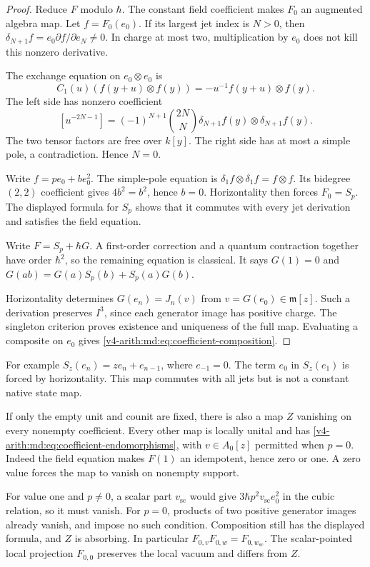 \begin{proof}
Reduce $F$ modulo $\hbar$. The constant field
coefficient makes $F_0$ an augmented algebra map.
Let $f=F_0(e_0)$. If its largest jet index is
$N>0$, then
$\delta_{N+1}f=e_0\partial f/\partial e_N\ne0$.
In charge at most two, multiplication by $e_0$
does not kill this nonzero derivative.

The exchange equation on $e_0\otimes e_0$ is
\[
 C_1(u)(f(y+u)\otimes f(y))
 =-u^{-1}f(y+u)\otimes f(y).
\]
The left side has nonzero coefficient
\[
 [u^{-2N-1}]=(-1)^{N+1}\binom{2N}{N}
       \delta_{N+1}f(y)\otimes\delta_{N+1}f(y).
\]
The two tensor factors are free over $k[y]$.
The right side has at most a simple pole, a
contradiction. Hence $N=0$.

Write $f=pe_0+be_0^2$. The simple-pole equation
is $\delta_1f\otimes\delta_1f=f\otimes f$.
Its bidegree $(2,2)$ coefficient gives
$4b^2=b^2$, hence $b=0$. Horizontality then
forces $F_0=S_p$. The displayed formula for
$S_p$ shows that it commutes with every jet
derivation and satisfies the field equation.

Write $F=S_p+\hbar G$. A first-order correction
and a quantum contraction together have order
$\hbar^2$, so the remaining equation is classical.
It says $G(1)=0$ and
$G(ab)=G(a)S_p(b)+S_p(a)G(b)$.

Horizontality determines $G(e_n)=J_n(v)$ from
$v=G(e_0)\in\mathfrak m[z]$. Such a derivation
preserves $I^3$, since each generator image has
positive charge. The singleton criterion proves
existence and uniqueness of the full map.
Evaluating a composite on $e_0$ gives
\eqref{v4-arith:md:eq:coefficient-composition}.
\end{proof}

For example $S_z(e_n)=ze_n+e_{n-1}$, where
$e_{-1}=0$. The term $e_0$ in $S_z(e_1)$ is
forced by horizontality. This map commutes with
all jets but is not a constant native state map.

If only the empty unit and counit are fixed,
there is also a map $Z$ vanishing on every
nonempty coefficient. Every other map is locally
unital and has \eqref{v4-arith:md:eq:coefficient-endomorphisms},
with $v\in A_0[z]$ permitted when $p=0$.
Indeed the field equation makes $F(1)$ an
idempotent, hence zero or one. A zero value
forces the map to vanish on nonempty support.

For value one and $p\ne0$, a scalar part
$v_{\mathrm{sc}}$ would give
$3\hbar p^2v_{\mathrm{sc}}e_0^2$ in the cubic
relation, so it must vanish.
For $p=0$, products of two positive generator
images already vanish, and impose no such condition.
Composition still has the displayed formula,
and $Z$ is absorbing. In particular
$F_{0,v}F_{0,w}=F_{0,w_{\mathrm{sc}}}$.
The scalar-pointed local projection $F_{0,0}$
preserves the local vacuum and differs from $Z$.

